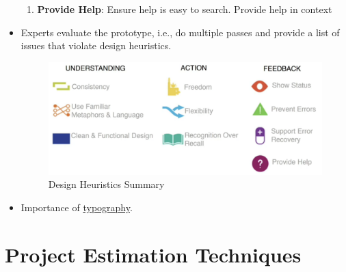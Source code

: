 \documentclass[a4paper]{article}
\begin{document}
\begin{itemize}
\begin{enumerate}
        \item \textbf{Provide Help}: Ensure help is easy to search. Provide help in context
    \end{enumerate}
    \item Experts evaluate the prototype, i.e., do multiple passes and provide a list of issues that violate design heuristics.
    \begin{figure}[H]
        \centering
        \includegraphics[width=0.5\linewidth]{Degree//static/SE_heuristic_summary.png}
        \caption{Design Heuristics Summary}
        \label{fig:ST-design-heuristic-summary}
    \end{figure}
    \item Importance of \href{https://www.vox.com/first-person/2017/3/1/14777110/typography-oscars-2017}{typography}.
\end{itemize}

\section{Project Estimation Techniques}
\end{document}
